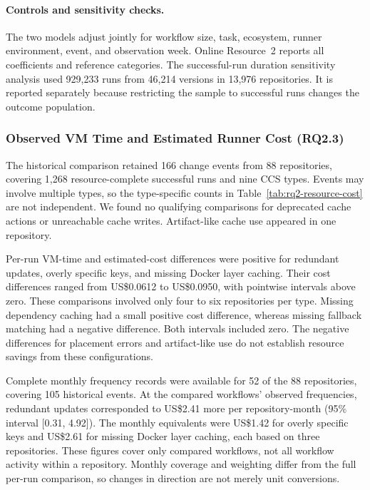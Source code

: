\documentclass[smallextended]{svjour3}
\begin{document}
\paragraph{Controls and sensitivity checks.}
The two models adjust jointly for workflow size, task, ecosystem, runner environment, event, and observation week. Online Resource~2 reports all coefficients and reference categories. The successful-run duration sensitivity analysis used 929,233 runs from 46,214 versions in 13,976 repositories. It is reported separately because restricting the sample to successful runs changes the outcome population.

\begingroup
\raggedbottom
\subsubsection{Observed VM Time and Estimated Runner Cost (RQ2.3)}

The historical comparison retained 166 change events from 88 repositories, covering 1,268 resource-complete successful runs and nine CCS types. Events may involve multiple types, so the type-specific counts in Table~\ref{tab:rq2-resource-cost} are not independent. We found no qualifying comparisons for deprecated cache actions or unreachable cache writes. Artifact-like cache use appeared in one repository.

Per-run VM-time and estimated-cost differences were positive for redundant updates, overly specific keys, and missing Docker layer caching. Their cost differences ranged from US\$0.0612 to US\$0.0950, with pointwise intervals above zero. These comparisons involved only four to six repositories per type. Missing dependency caching had a small positive cost difference, whereas missing fallback matching had a negative difference. Both intervals included zero. The negative differences for placement errors and artifact-like use do not establish resource savings from these configurations.

Complete monthly frequency records were available for 52 of the 88 repositories, covering 105 historical events. At the compared workflows' observed frequencies, redundant updates corresponded to US\$2.41 more per repository-month (95\% interval [0.31, 4.92]). The monthly equivalents were US\$1.42 for overly specific keys and US\$2.61 for missing Docker layer caching, each based on three repositories. These figures cover only compared workflows, not all workflow activity within a repository. Monthly coverage and weighting differ from the full per-run comparison, so changes in direction are not merely unit conversions.
\end{document}
